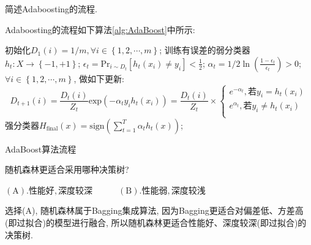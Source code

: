 \documentclass{article}
\begin{document}
\pagebreak


\begin{homeworkProblem}
	简述Adaboosting的流程.

	\solution Adaboosting的流程如下算法\ref{alg:AdaBoost}中所示:
	\begin{algorithm}[H]
		\begin{algorithmic}[1]
		\State 初始化$D_1\left( i \right) =1/m,\forall i\in \left\{ 1,2,\cdots ,m \right\}$;
			\State 训练有误差的弱分类器$h_t:X\rightarrow \left\{ -1,+1 \right\} $;
			\State $\displaystyle \epsilon _t=\text{Pr}_{i\sim D_t}\left[ h_t\left( x_i \right) \ne y_i \right] <\frac{1}{2}$; 
			\State $\displaystyle \alpha _t=1/2\ln \left( \frac{1-\epsilon _t}{\epsilon _t} \right) >0$; 
			\State $\forall i\in \left\{ 1,2,\cdots ,m \right\} $, 做如下更新:$$D_{t+1}\left( i \right) =\frac{D_t\left( i \right)}{Z_t}\text{exp} \left( -\alpha _ty_ih_t\left( x_i \right) \right) =\frac{D_t\left( i \right)}{Z_t}\times \begin{cases}
				e^{-\alpha _t},\text{若}y_i=h_t\left( x_i \right)\\
				e^{\alpha _t},\text{若}y_i\ne h_t\left( x_i \right)\\
			\end{cases}$$
		\EndFor
		\State \Return 强分类器$\displaystyle H_{\text{final}}\left( x \right) =\text{sign}\left( \sum_{t=1}^T{\alpha _th_t\left( x \right)} \right)$; 
		\end{algorithmic}
		\caption{AdaBoost算法流程}
		\label{alg:AdaBoost}
	\end{algorithm}
\end{homeworkProblem}


\begin{homeworkProblem}
	随机森林更适合采用哪种决策树?

	$\left( \text{A} \right) . \text{性能好}, \text{深度较深}\quad \quad \quad \left( \text{B} \right) . \text{性能弱}, \text{深度较浅}$

	\solution 选择(A), 随机森林属于Bagging集成算法, 因为Bagging更适合对偏差低、方差高(即过拟合)的模型进行融合, 所以随机森林更适合性能好、深度较深(即过拟合)的决策树.
\end{homeworkProblem}
\end{document}
